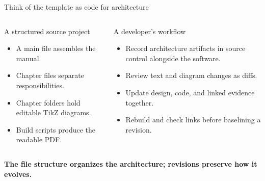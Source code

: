\begin{frame}{Think of the template as code for architecture}
\begin{columns}[T,onlytextwidth]
\begin{block}{A structured source project}
\begin{itemize}
  \item A main file assembles the manual.
  \item Chapter files separate responsibilities.
  \item Chapter folders hold editable TikZ diagrams.
  \item Build scripts produce the readable PDF.
\end{itemize}
\end{block}
\begin{block}{A developer's workflow}
\begin{itemize}
  \item Record architecture artifacts in source control alongside the software.
  \item Review text and diagram changes as diffs.
  \item Update design, code, and linked evidence together.
  \item Rebuild and check links before baselining a revision.
\end{itemize}
\end{block}
\end{columns}
\vspace{0.2cm}
\textbf{The file structure organizes the architecture; revisions preserve how it evolves.}
\end{frame}
